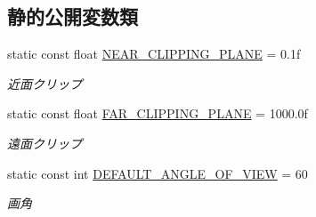 \subsection*{静的公開変数類}
\begin{DoxyCompactItemize}
\item 
static const float \mbox{\hyperlink{class_camera_ad2e91249b7878a87cd23cf7dd5d86e00}{N\+E\+A\+R\+\_\+\+C\+L\+I\+P\+P\+I\+N\+G\+\_\+\+P\+L\+A\+NE}} = 0.\+1f
\begin{DoxyCompactList}\small\item\em 近面クリップ \end{DoxyCompactList}\item 
static const float \mbox{\hyperlink{class_camera_a90ee4c7f7bbcb5d2b0ab86d14ed60d90}{F\+A\+R\+\_\+\+C\+L\+I\+P\+P\+I\+N\+G\+\_\+\+P\+L\+A\+NE}} = 1000.\+0f
\begin{DoxyCompactList}\small\item\em 遠面クリップ \end{DoxyCompactList}\item 
static const int \mbox{\hyperlink{class_camera_a0e0f326c66006cf7f9dc29b3e2b86b81}{D\+E\+F\+A\+U\+L\+T\+\_\+\+A\+N\+G\+L\+E\+\_\+\+O\+F\+\_\+\+V\+I\+EW}} = 60
\begin{DoxyCompactList}\small\item\em 画角 \end{DoxyCompactList}\end{DoxyCompactItemize}
